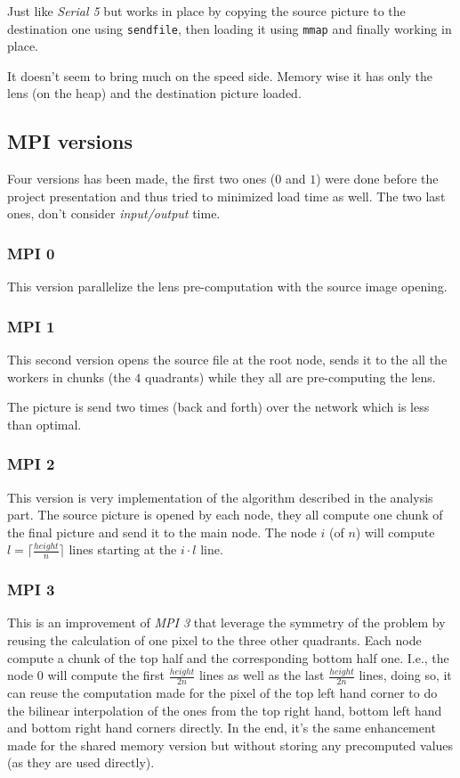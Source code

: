 \documentclass[10pt,a4paper]{article}
\begin{document}
Just like \emph{Serial 5} but works in place by copying the source picture to
the destination one using \verb|sendfile|, then loading it using \verb|mmap|
and finally working in place.

It doesn't seem to bring much on the speed side. Memory wise it has only the
lens (on the heap) and the destination picture loaded.

\subsection{MPI versions}

Four versions has been made, the first two ones ($0$ and $1$) were done before
the project presentation and thus tried to minimized load time as well. The
two last ones, don't consider \emph{input/output} time.

\subsubsection{MPI 0}

This version parallelize the lens pre-computation with the source image opening.

\subsubsection{MPI 1}

This second version opens the source file at the root node, sends it to the all
the workers in chunks (the $4$ quadrants) while they all are pre-computing the
lens.

The picture is send two times (back and forth) over the network which is less
than optimal.

\subsubsection{MPI 2}

This version is very implementation of the algorithm described in the analysis
part. The source picture is opened by each node, they all compute one chunk of
the final picture and send it to the main node. The node $i$ (of $n$) will
compute $l = \lceil{}\frac{height}{n}\rceil{}$ lines starting at the $i \cdot
l$ line.

\subsubsection{MPI 3}

This is an improvement of \emph{MPI 3} that leverage the symmetry of the
problem by reusing the calculation of one pixel to the three other quadrants.
Each node compute a chunk of the top half and the corresponding bottom half one.
I.e., the node $0$ will compute the first $\frac{height}{2 n}$ lines as well as
the last $\frac{height}{2 n}$ lines, doing so, it can reuse the computation
made for the pixel of the top left hand corner to do the bilinear interpolation
of the ones from the top right hand, bottom left hand and bottom right hand
corners directly. In the end, it's the same enhancement made for the shared
memory version but without storing any precomputed values (as they are used
directly).
\end{document}
